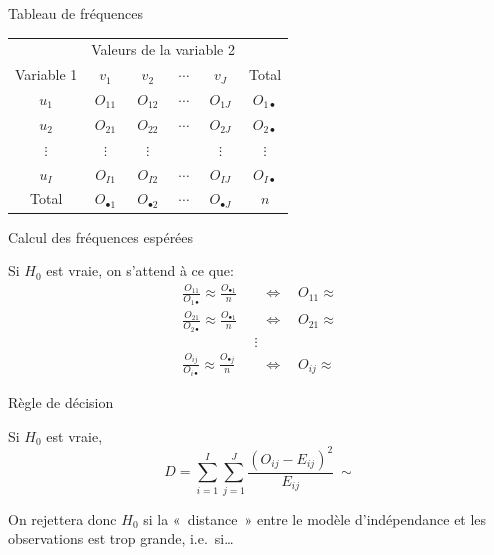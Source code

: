 \documentclass{BeamerTemplate}
\begin{document}
\begin{frame}[t]{Tableau de fréquences}

\begin{center}
\renewcommand{\arraystretch}{1.5}
\begin{tabular}{c|cccc|c}
 & \multicolumn{4}{c|}{Valeurs de la variable 2} & \\
Variable 1 & $v_1$ & $v_2$ & $\cdots$ & $v_J$ & Total\\
\hline
$u_1$ & $O_{11}$ & $O_{12}$ & $\cdots$ & $O_{1J}$ & $O_{1\bullet}$\\
$u_2$ & $O_{21}$ & $O_{22}$ & $\cdots$ & $O_{2J}$ & $O_{2\bullet}$\\
$\vdots$ & $\vdots$ & $\vdots$ & & $\vdots$ & $\vdots$\\
$u_I$ & $O_{I1}$ & $O_{I2}$ & $\cdots$ & $O_{IJ}$ & $O_{I\bullet}$\\
\hline
Total & $O_{\bullet1}$ & $O_{\bullet2}$ & $\cdots$ & $O_{\bullet J}$ & $n$\\
\end{tabular}
\end{center}


\end{frame}

\begin{frame}[t]{Calcul des fréquences espérées}

Si $H_0$ est vraie, on s'attend à ce que:
\begin{align*}
\frac{O_{11}}{O_{1\bullet}}\approx\frac{O_{\bullet1}}{n}
&\quad\Longleftrightarrow\quad O_{11}\approx\\[2mm]
\frac{O_{21}}{O_{2\bullet}}\approx\frac{O_{\bullet1}}{n}
&\quad\Longleftrightarrow\quad O_{21}\approx\\
&\ \ \vdots\\
\frac{O_{ij}}{O_{i\bullet}}\approx\frac{O_{\bullet j}}{n}
&\quad\Longleftrightarrow\quad O_{ij}\approx
\end{align*}

\end{frame}

\begin{frame}[t]{Règle de décision}

Si $H_0$ est vraie,
\[
D=\sum_{i=1}^{I}\sum_{j=1}^{J}\frac{(O_{ij}-E_{ij})^2}{E_{ij}}\ \sim
\]

\vspace{1.5cm}
On rejettera donc $H_0$ si la «~distance~» entre le modèle d'indépendance et
les observations est trop grande, i.e.\ si\ldots

\end{frame}
\end{document}

